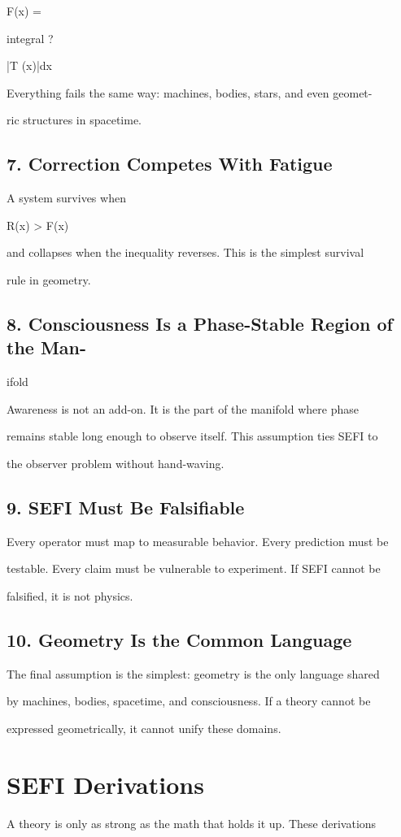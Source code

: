 \documentclass[10pt]{article}
\begin{document}
F(x) =

integral ?

|T (x)|dx

Everything fails the same way: machines, bodies, stars, and even geomet-

ric structures in spacetime.

\subsection*{7. Correction Competes With Fatigue}
A system survives when

R(x) > F(x)

and collapses when the inequality reverses. This is the simplest survival

rule in geometry.

\subsection*{8. Consciousness Is a Phase-Stable Region of the Man-}
ifold

Awareness is not an add-on. It is the part of the manifold where phase

remains stable long enough to observe itself. This assumption ties SEFI to

the observer problem without hand-waving.

\subsection*{9. SEFI Must Be Falsifiable}
Every operator must map to measurable behavior. Every prediction must be

testable. Every claim must be vulnerable to experiment. If SEFI cannot be

falsified, it is not physics.


\subsection*{10. Geometry Is the Common Language}
The final assumption is the simplest: geometry is the only language shared

by machines, bodies, spacetime, and consciousness. If a theory cannot be

expressed geometrically, it cannot unify these domains.

\section*{SEFI Derivations}
A theory is only as strong as the math that holds it up. These derivations
\end{document}
